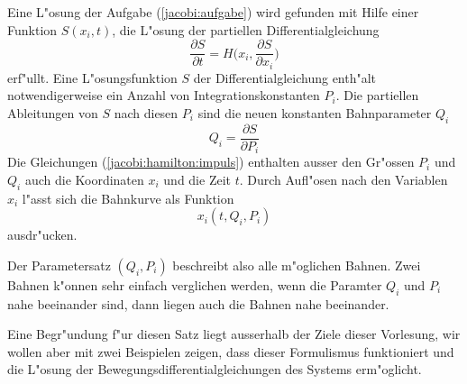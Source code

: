 \begin{satz}
\label{jacobi:satz}
Eine L"osung der Aufgabe (\ref{jacobi:aufgabe}) wird gefunden mit
Hilfe einer Funktion $S(x_i, t)$, die L"osung der partiellen
Differentialgleichung
\begin{equation}
\frac{\partial S}{\partial t}
=
H\biggl(
x_i,
\frac{\partial S}{\partial x_i}
\biggr)
\label{jacobi:hamilton:dgl}
\end{equation}
erf"ullt.
Eine L"osungsfunktion $S$ der Differentialgleichung enth"alt notwendigerweise
ein Anzahl von Integrationskonstanten $P_i$.
Die partiellen Ableitungen von $S$ nach diesen $P_i$
sind die neuen konstanten Bahnparameter $Q_i$
\begin{equation}
Q_i=\frac{\partial S}{\partial P_i}
\label{jacobi:hamilton:impuls}
\end{equation}
Die Gleichungen (\ref{jacobi:hamilton:impuls}) enthalten ausser den
Gr"ossen $P_i$ und $Q_i$ auch die Koordinaten $x_i$ und die Zeit $t$.
Durch Aufl"osen nach den Variablen $x_i$ l"asst sich die Bahnkurve
als Funktion
\[
x_i(t,Q_i,P_i)
\]
ausdr"ucken.
\end{satz}
Der Parametersatz $(Q_i,P_i)$ beschreibt also alle m"oglichen 
Bahnen. Zwei Bahnen k"onnen sehr einfach verglichen werden, wenn die
Paramter $Q_i$ und $P_i$ nahe beeinander sind, dann liegen auch
die Bahnen nahe beeinander.

Eine Begr"undung f"ur diesen Satz liegt ausserhalb der Ziele
dieser Vorlesung, wir wollen aber mit zwei Beispielen zeigen,
dass dieser Formulismus funktioniert und die L"osung der
Bewegungsdifferentialgleichungen des Systems erm"oglicht.

